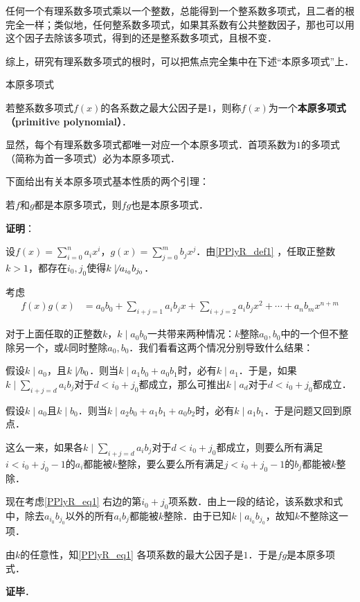 
任何一个有理系数多项式乘以一个整数，总能得到一个整系数多项式，且二者的根完全一样；类似地，任何整系数多项式，如果其系数有公共整数因子，那也可以用这个因子去除该多项式，得到的还是整系数多项式，且根不变．

综上，研究有理系数多项式的根时，可以把焦点完全集中在下述“本原多项式”上．


\begin{definition}{本原多项式}\label{PPlyR_def1}

若整系数多项式$f(x)$的各系数之最大公因子是$1$，则称$f(x)$为一个\textbf{本原多项式（primitive polynomial）}．

\end{definition}

显然，每个有理系数多项式都唯一对应一个本原多项式．首项系数为$1$的多项式（简称为首一多项式）必为本原多项式．

下面给出有关本原多项式基本性质的两个引理：

\begin{lemma}{}
若$f$和$g$都是本原多项式，则$fg$也是本原多项式．
\end{lemma}

\textbf{证明}：

设$f(x) = \sum_{i=0}^n a_ix^i$，$g(x) = \sum_{j=0}^m b_jx^j$．由\autoref{PPlyR_def1} ，任取正整数$k>1$，都存在$i_0, j_0$使得$k\not\mid a_{i_0}b_{j_0}$．

考虑
\begin{equation}\label{PPlyR_eq1}
\begin{aligned}
f(x)g(x) &= a_0b_0 + \sum_{i+j=1}a_ib_jx + \sum_{i+j=2}a_ib_jx^2+\cdots +a_nb_mx^{n+m}
\end{aligned}
\end{equation}

对于上面任取的正整数$k$，$k\mid a_0b_0$一共带来两种情况：$k$整除$a_0, b_0$中的一个但不整除另一个，或$k$同时整除$a_0, b_0$．我们看看这两个情况分别导致什么结果：

假设$k\mid a_0$，且$k\not\mid b_0$．则当$k\mid a_1b_0+a_0b_1$时，必有$k\mid a_1$．于是，如果$k\mid\sum_{i+j=d}a_ib_j$对于$d<i_0+j_0$都成立，那么可推出$k\mid a_d$对于$d<i_0+j_0$都成立．

假设$k\mid a_0$且$k\mid b_0$．则当$k\mid a_2b_0+a_1b_1+a_0b_2$时，必有$k\mid a_1b_1$．于是问题又回到原点．

这么一来，如果各$k\mid\sum_{i+j=d}a_ib_j$对于$d<i_0+j_0$都成立，则要么所有满足$i<i_0+j_0-1$的$a_i$都能被$k$整除，要么要么所有满足$j<i_0+j_0-1$的$b_j$都能被$k$整除．

现在考虑\autoref{PPlyR_eq1} 右边的第$i_0+j_0$项系数．由上一段的结论，该系数求和式中，除去$a_{i_0}b_{j_0}$以外的所有$a_ib_j$都能被$k$整除．由于已知$k\mid a_{i_0}b_{j_0}$，故知$k$不整除这一项．

由$k$的任意性，知\autoref{PPlyR_eq1} 各项系数的最大公因子是$1$．于是$fg$是本原多项式．



\textbf{证毕}．


















